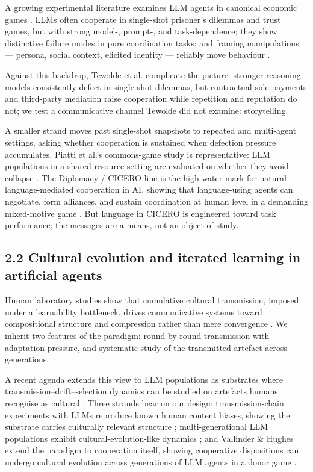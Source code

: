 \documentclass[10pt,letterpaper]{article}
\begin{document}
A growing experimental literature examines LLM agents in canonical
economic games \citep{aher2023, akata2023, fontana2024, horton2023, leng2023, lore2024}. LLMs
often cooperate in single-shot prisoner's dilemmas and trust games, but
with strong model-, prompt-, and task-dependence; they show distinctive
failure modes in pure coordination tasks; and framing manipulations ---
persona, social context, elicited identity --- reliably move behaviour
\citep{serapio2023}.

Against this backdrop, Tewolde et al. \citep{tewolde2026}
complicate the picture: stronger reasoning models consistently defect in
single-shot dilemmas, but contractual side-payments and third-party
mediation raise cooperation while repetition and reputation do not; we
test a communicative channel Tewolde did not examine: storytelling.

A smaller strand moves past single-shot snapshots to repeated and
multi-agent settings, asking whether cooperation is sustained when
defection pressure accumulates. Piatti et al.'s commons-game study is
representative: LLM populations in a shared-resource setting are
evaluated on whether they avoid collapse \citep{piatti2024}. The
Diplomacy / CICERO line is the high-water mark for
natural-language-mediated cooperation in AI, showing that language-using
agents can negotiate, form alliances, and sustain coordination at human
level in a demanding mixed-motive game \citep{bakhtin2022}. But
language in CICERO is engineered toward task performance; the messages
are a means, not an object of study.

\subsection{2.2 Cultural evolution and iterated learning in artificial
agents}\label{cultural-evolution-and-iterated-learning-in-artificial-agents}

Human laboratory studies show that cumulative cultural transmission,
imposed under a learnability bottleneck, drives communicative systems
toward compositional structure and compression rather than mere
convergence \citep{kirby2015, raviv2019, tamariz2016}. We inherit two features of the paradigm: round-by-round
transmission with adaptation pressure, and systematic study of the
transmitted artefact across generations.

A recent agenda extends this view to LLM populations as substrates where
transmission--drift--selection dynamics can be studied on artefacts
humans recognise as cultural \citep{brinkmann2023, perez2024}. Three strands bear on our design: transmission-chain
experiments with LLMs reproduce known human content biases, showing the
substrate carries culturally relevant structure \citep{acerbi2023}; multi-generational LLM populations exhibit
cultural-evolution-like dynamics \citep{perez2024}; and Vallinder
\& Hughes extend the paradigm to cooperation itself, showing cooperative
dispositions can undergo cultural evolution across generations of LLM
agents in a donor game \citep{vallinder2024}.
\end{document}
